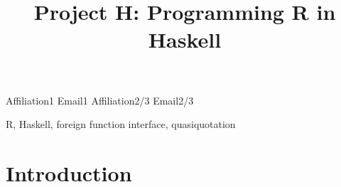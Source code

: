 \documentclass[preprint,authoryear]{sigplanconf}
\begin{document}

\exclusivelicense

\title{Project H: Programming R in Haskell}

           {Affiliation1}
           {Email1}
           {Affiliation2/3}
           {Email2/3}

\maketitle

\begin{abstract}
  
\end{abstract}


\keywords
R, Haskell, foreign function interface, quasiquotation

\section{Introduction}

\acks



\end{document}

